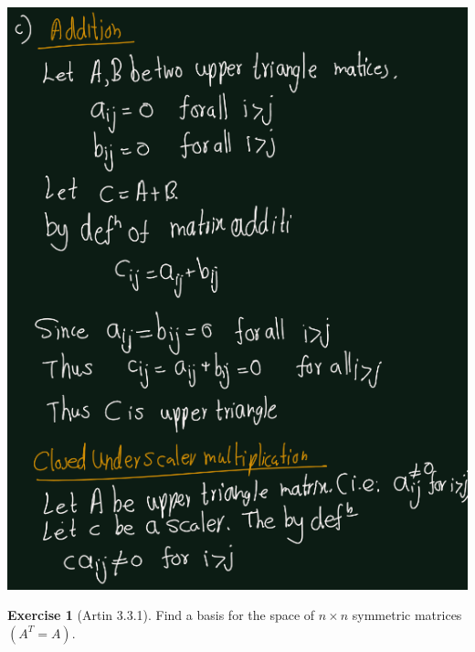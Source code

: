 \documentclass[
]{book}
\theoremstyle{definition}
\theoremstyle{definition}
\theoremstyle{definition}
\newtheorem{exercise}{Exercise}[chapter]
\theoremstyle{definition}
\theoremstyle{remark}
\begin{document}
\includegraphics{figures/ch_3/ex-2.2-c.png}

\begin{exercise}[Artin 3.3.1]
\protect\hypertarget{exr:unnamed-chunk-289}{}\label{exr:unnamed-chunk-289}Find a basis for the space of \(n \times n\) symmetric matrices \((A^T = A)\).
\end{exercise}
\end{document}
